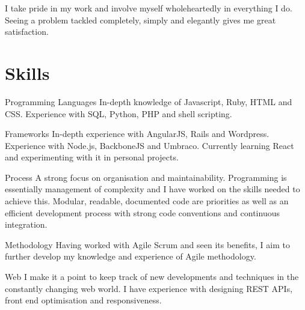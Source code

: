 \documentclass[10pt,a4paper,sans]{moderncv}        %
\begin{document}
\makecvtitle

\small{I take pride in my work and involve myself wholeheartedly in everything I do. Seeing a problem tackled completely, simply and elegantly gives me great satisfaction.}

\vspace{10pt}

\section{Skills}

\vspace{6pt}

\cvline
{\textcolor{light}{Programming Languages}}
{In-depth knowledge of Javascript, Ruby, HTML and CSS. Experience with SQL, Python, PHP and shell scripting.}

\vspace{6pt}

\cvline
{\textcolor{light}{Frameworks}}
{In-depth experience with AngularJS, Rails and Wordpress. Experience with Node.js, BackboneJS and Umbraco. Currently learning React and experimenting with it in personal projects.}

\vspace{6pt}

\cvline
{\textcolor{light}{Process}}
{A strong focus on organisation and maintainability. Programming is essentially management of complexity and I have worked on the skills needed to achieve this. 
\endgraf
\vspace{4pt}
Modular, readable, documented code are priorities as well as an efficient development process with strong code conventions and continuous integration.}

\vspace{6pt}

\cvline
{\textcolor{light}{Methodology}}
{Having worked with Agile Scrum and seen its benefits, I aim to further develop my knowledge and experience of Agile methodology.}

\vspace{6pt}

\cvline
{\textcolor{light}{Web}}
{I make it a point to keep track of new developments and techniques in the constantly changing web world. I have experience with designing REST APIs, front end optimisation and responsiveness.}
\end{document}
